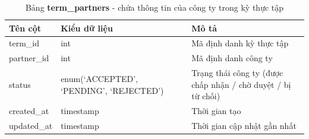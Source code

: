 \documentclass[./../main.tex]{subfiles}
\begin{document}
\begin{table}[H]
	\caption[Bảng term\_partners]{Bảng \textbf{term\_partners} - chứa thông tin của công ty trong kỳ thực tập}
	\label{tab:db_term_partners}
	\begin{tabularx}{\textwidth}{|l|X|X|}
		\hline
		\textbf{Tên cột} & \textbf{Kiểu dữ liệu}                   & \textbf{Mô tả}                                               \\ \hline
		term\_id         & int                                     & Mã định danh kỳ thực tập                                     \\ \hline
		partner\_id      & int                                     & Mã định danh công ty                                         \\ \hline
		status           & enum(‘ACCEPTED', ‘PENDING', ‘REJECTED’) & Trạng thái công ty (được chấp nhận / chờ duyệt / bị từ chối) \\ \hline
		created\_at      & timestamp                               & Thời gian tạo                                                \\ \hline
		updated\_at      & timestamp                               & Thời gian cập nhật gần nhất                                  \\ \hline
	\end{tabularx}
\end{table}
\end{document}
